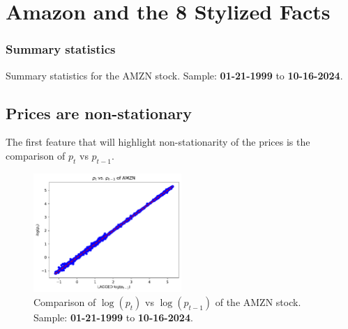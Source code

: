 \documentclass{article}
\begin{document}
%

\clearpage

\section{Amazon and the 8 Stylized Facts}

\subsubsection{Summary statistics}


\begin{table}[H]
    \centering
      
    \caption{Summary statistics for the AMZN stock.
    Sample: \textbf{01-21-1999} to \textbf{10-16-2024}.}
    \label{tab:Stylized_facts_preview}
\end{table}



\subsection{Prices are non-stationary}

The first feature that will highlight non-stationarity of
the prices is the comparison of \( p_t \) vs \( p_{t-1} \).

\begin{figure}[H]
    \centering
    \includegraphics[width=0.5\textwidth]{Img/Laggedlog(p_t-1).pdf}
    \caption{Comparison of \( \log(p_t) \) vs \( \log(p_{t-1}) \) of the AMZN stock.
    Sample: \textbf{01-21-1999} to \textbf{10-16-2024}.}
    \label{fig:LogptVSLogpt-1}
\end{figure}
\end{document}
